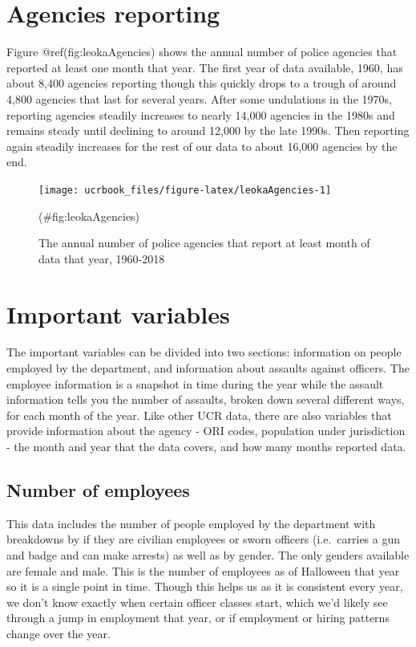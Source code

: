 \documentclass[
  12pt,
  openany]{book}
\begin{document}
\hypertarget{agencies-reporting-4}{%
\section{Agencies reporting}\label{agencies-reporting-4}}

Figure @ref(fig:leokaAgencies) shows the annual number of police agencies that reported at least one month that year. The first year of data available, 1960, has about 8,400 agencies reporting though this quickly drops to a trough of around 4,800 agencies that last for several years. After some undulations in the 1970s, reporting agencies steadily increases to nearly 14,000 agencies in the 1980s and remains steady until declining to around 12,000 by the late 1990s. Then reporting again steadily increases for the rest of our data to about 16,000 agencies by the end.

\begin{figure}

{\centering \texttt{[image: ucrbook\_files/figure-latex/leokaAgencies-1]} 

}

\caption{The annual number of police agencies that report at least month of data that year, 1960-2018}(\#fig:leokaAgencies)
\end{figure}

\hypertarget{important-variables-4}{%
\section{Important variables}\label{important-variables-4}}

The important variables can be divided into two sections: information on people employed by the department, and information about assaults against officers. The employee information is a snapshot in time during the year while the assault information tells you the number of assaults, broken down several different ways, for each month of the year. Like other UCR data, there are also variables that provide information about the agency - ORI codes, population under jurisdiction - the month and year that the data covers, and how many months reported data.

\hypertarget{number-of-employees}{%
\subsection{Number of employees}\label{number-of-employees}}

This data includes the number of people employed by the department with breakdowns by if they are civilian employees or sworn officers (i.e.~carries a gun and badge and can make arrests) as well as by gender. The only genders available are female and male. This is the number of employees as of Halloween that year so it is a single point in time. Though this helps us as it is consistent every year, we don't know exactly when certain officer classes start, which we'd likely see through a jump in employment that year, or if employment or hiring patterns change over the year.
\end{document}
